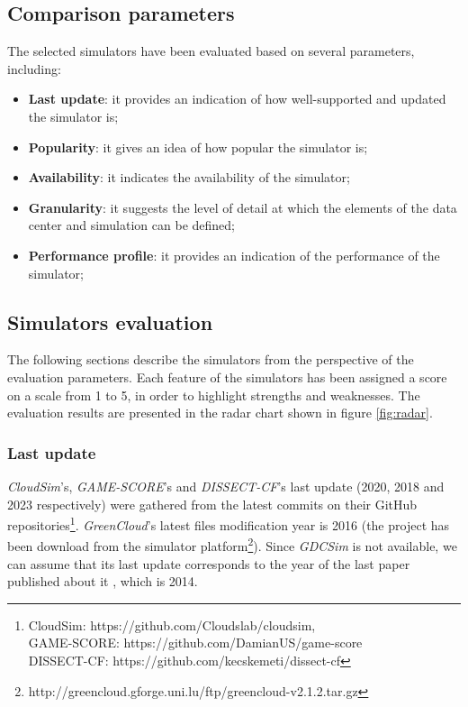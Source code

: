 {\subsection{Comparison parameters}
The selected simulators have been evaluated based on several parameters, including:
\begin{itemize}
    \item \textbf{Last update}: it provides an indication of how well-supported and updated the simulator is; 
    \item \textbf{Popularity}: it gives an idea of how popular the simulator is; 
    \item \textbf{Availability}: it indicates the availability of the simulator;
    \item \textbf{Granularity}: it suggests the level of detail at which the elements of the data center and simulation can be defined; 
    \item \textbf{Performance profile}: it provides an indication of the performance of the simulator;
\end{itemize}

\subsection{Simulators evaluation}
The following sections describe the simulators from the perspective of the evaluation parameters. Each feature of the simulators has been assigned a score on a scale from 1 to 5, in order to highlight strengths and weaknesses. The evaluation results are presented in the radar chart shown in figure \ref{fig:radar}.

\subsubsection{Last update}
\emph{CloudSim}'s, \emph{GAME-SCORE}'s and \emph{DISSECT-CF}'s last update (2020, 2018 and 2023 respectively) were gathered from the latest commits on their GitHub repositories\footnote{CloudSim: https://github.com/Cloudslab/cloudsim,\\ GAME-SCORE: https://github.com/DamianUS/game-score \\ DISSECT-CF: https://github.com/kecskemeti/dissect-cf}. \emph{GreenCloud}'s latest files modification year is 2016 (the project has been download from the simulator platform\footnote{http://greencloud.gforge.uni.lu/ftp/greencloud-v2.1.2.tar.gz}). Since \emph{GDCSim} is not available, we can assume that its last update corresponds to the year of the last paper published about it \cite{gdcsim_latest}, which is 2014.

}
